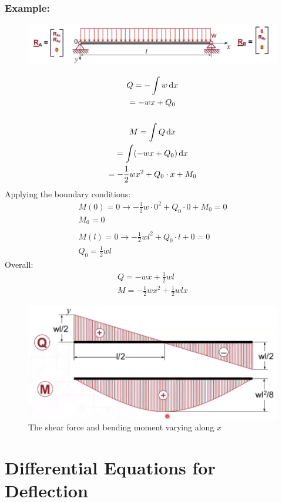 \documentclass[class=report, crop=false, 12pt,a4paper]{standalone}
\begin{document}
\subsubsection{Example:}
\begin{figure}[H]
  \centering
  \includegraphics[width = 1 \textwidth]{../img/example1.PNG}
\end{figure}
\begin{gather}
  Q = -\int w \dif x \\
  = -wx + Q_0 \\\\
  M = \int Q \dif x \\
  = \int(-wx+Q_0)\dif x \\
  = -\frac{1}{2}wx^2 + Q_0\cdot x + M_0
\end{gather}
Applying the boundary conditions: 
\begin{gather}
  M(0) = 0 \rightarrow -\frac{1}{2}w\cdot 0^2 + Q_0\cdot 0 + M_0 = 0 \\
  M_0 = 0 \\\\
  M(l) = 0 \rightarrow -\frac{1}{2}wl^2 + Q_0\cdot l + 0 = 0 \\
  Q_0 = \frac{1}{2}wl
\end{gather}
Overall:
\begin{gather}
  Q = -wx + \frac{1}{2}wl \\
  M = -\frac{1}{2}wx^2 + \frac{1}{2}wlx
\end{gather}
\begin{figure}[H]
  \centering
  \includegraphics[width = 0.7 \textwidth]{../img/example1graphs.PNG}
  \caption{The shear force and bending moment varying along $x$}
\end{figure}
\section{Differential Equations for Deflection}
\end{document}
